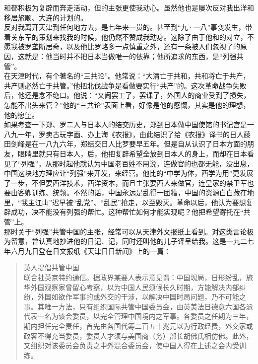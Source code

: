 和都积极为复辟而奔走活动，但的主张更使我动心。虽然他也是屡次反对我出洋和移居旅顺、大连的计划的。\\

反对我离开天津到任何地方去，是七年来一贯的。甚至到“九·一八”事变发生，带着关东军的策划来找我的时候，他仍然不赞成我动身。这除了由于他和的对立，不愿我被罗垄断居奇，以及他比罗略多一点慎重之外，还有一条被人们忽视了的原因，这就是：他当时并不把日本当做唯一的依靠；他所追求的东西，是“列强共管”。\\

在天津时代，有个著名的“三共论”。他常说：“大清亡于共和，共和将亡于共产，共产则必然亡于共管。”他把北伐战争是看做要实行“共产”的。这次革命战争失败后，他还是念不绝口。他说：“又闹罢工了，罢课了，外国人的商业受到了损失，怎能不出头来管？”他的“三共论”表面上看，好像是他的感慨，其实是他的理想，他的愿望。\\

如果考查一下郑、罗二人与日本人的结交历史，郑到日本做中国使馆的书记宫是一八九一年，罗卖古玩字画、办上海《农报》，由此结识了给《农报》译书的日人藤田剑峰是在一八九六年，郑结交日人比罗要早五年。但是自从认识了日本方面的朋友，眼睛里就只有日本人，后，他把复辟希望全放到日本人的身上，而却在日本看见了“列强”，从那时起他就认为中国老百姓不用说，连做官的也都无能，没出息，中国这块地方理应让“列强”来开发，来经营。他比的“中学为体，西学为用”更发展了一步，不但要西洋技术，西洋资本，而且主张要西人来做官，连皇家的禁卫军也要由客卿训练、统领。不然的话，中国永远是乱得一团糟，中国的资源白白藏在地里，“我主江山”迟早被“乱党”、“乱民”抢走，以至毁灭。革命以后，他认为要想复辟成功，决不能没有列强的帮忙。这种帮忙如何才能实现呢？他把希望寄托在“共管”上。\\

那时关于“列强”共管中国的主张，经常可以从天津外文报纸上看到。对这类言论极为留意，曾认真地抄进他的日记、记，同时还叫他的儿子译呈给我。这是一九二七年六月九日登在日文报纸《天津日日新闻》上的一篇：\\

\begin{quote}
	英人提倡共管中国\\

联合社英京特约通信。据政界某要人表示意见谓：中国现局，日形纷乱，旅华外国观察家曾留心考察，以为中国人民须候长久时期，方能解决内部纠纷，外国如欲作军事的或外交的干涉，以解决中国时局问题，乃不可能之事。其唯一方法，只有组织国际共管中国委员会，由英美法日德意六国各派代表一名为该会委员，以完全管理中国境内之军事。各委员之任期为三年，期内担任完全责任，首先由各国代筹二百五十兆元以为行政经费，外交家或政客不得充当委员，委员人才须与美国商（务）部长胡佛氏相仿佛。此外，又组织对该委员会负责之中外混合委员会，使中国人得在上述之会内受训练。\\
\end{quote}

